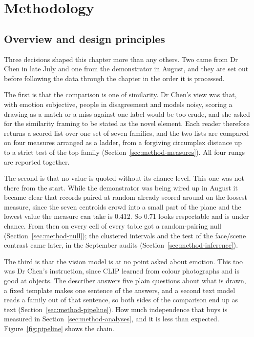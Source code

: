 \chapter{Methodology}
\label{ch:method}

\section{Overview and design principles}
\label{sec:method-overview}

Three decisions shaped this chapter more than any others. Two came from Dr Chen in late July and one from the demonstrator in August, and they are set out before following the data through the chapter in the order it is processed.

The first is that the comparison is one of similarity. Dr Chen's view was that, with emotion subjective, people in disagreement and models noisy, scoring a drawing as a match or a miss against one label would be too crude, and she asked for the similarity framing to be stated as the novel element. Each reader therefore returns a scored list over one set of seven families, and the two lists are compared on four measures arranged as a ladder, from a forgiving circumplex distance up to a strict test of the top family (Section~\ref{sec:method-measures}). All four rungs are reported together.

The second is that no value is quoted without its chance level. This one was not there from the start. While the demonstrator was being wired up in August it became clear that records paired at random already scored around \FullNeuVaNull{} on the loosest measure, since the seven centroids crowd into a small part of the plane and the lowest value the measure can take is 0.412. So 0.71 looks respectable and is under chance. From then on every cell of every table got a random-pairing null (Section~\ref{sec:method-null}); the clustered intervals and the test of the face/scene contrast came later, in the September audits (Section~\ref{sec:method-inference}).

The third is that the vision model is at no point asked about emotion. This too was Dr Chen's instruction, since CLIP learned from colour photographs and is good at objects. The describer answers five plain questions about what is drawn, a fixed template makes one sentence of the answers, and a second text model reads a family out of that sentence, so both sides of the comparison end up as text (Section~\ref{sec:method-pipeline}). How much independence that buys is measured in Section~\ref{sec:method-analyses}, and it is less than expected. Figure~\ref{fig:pipeline} shows the chain.

